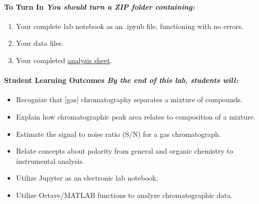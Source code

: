 \documentclass[]{tufte-book}
\providecommand{\tightlist}{%
  \setlength{\itemsep}{0pt}\setlength{\parskip}{0pt}}
\begin{document}
\hypertarget{to-turn-in-you-should-turn-a-zip-folder-containing-1}{%
\paragraph{\texorpdfstring{\textbf{To Turn In} \textbar{} \emph{You should turn a ZIP folder containing:}}{To Turn In \textbar{} You should turn a ZIP folder containing:}}\label{to-turn-in-you-should-turn-a-zip-folder-containing-1}}

\begin{enumerate}
\def\labelenumi{\arabic{enumi}.}
\tightlist
\item
  Your complete lab notebook as an .ipynb file, functioning with no errors.\\
\item
  Your data files.\\
\item
  Your completed \href{https://github.com/alphonse/alphonse.github.io/raw/master/devel/chem370/assignments/excel-templates/lab2_gctcd_data-analysis.xlsx}{analysis sheet}.
\end{enumerate}

\hypertarget{student-learning-outcomes-by-the-end-of-this-lab-students-will-2}{%
\paragraph{\texorpdfstring{\textbf{Student Learning Outcomes} \textbar{} \emph{By the end of this lab, students will:}}{Student Learning Outcomes \textbar{} By the end of this lab, students will:}}\label{student-learning-outcomes-by-the-end-of-this-lab-students-will-2}}

\begin{itemize}
\tightlist
\item
  Recognize that {[}gas{]} chromatography separates a mixture of compounds.\\
\item
  Explain how chromatographic peak area relates to composition of a mixture.\\
\item
  Estimate the signal to noise ratio (S/N) for a gas chromatograph.
\item
  Relate concepts about polarity from general and organic chemistry to instrumental analysis.\\
\item
  Utilize Jupyter as an electronic lab notebook.
\item
  Utilize Octave/MATLAB functions to analyze chromatographic data.
\end{itemize}
\end{document}

